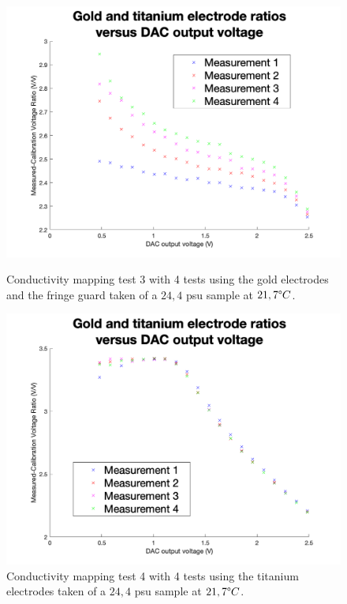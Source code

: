 \begin{figure}[ht]
    \begin{minipage}{0.5\textwidth}
        \centering
        \includegraphics[width=\textwidth]{Figures/Testing/Aus17}
        \caption{Conductivity mapping test 3 with 4 tests using the gold electrodes and the fringe guard taken of a $24,4$ \gls{psu} sample at $21,7\degree C$.}
        \label{fig:test11} %
    \end{minipage}
    \begin{minipage}{0.5\textwidth}
        \centering
        \includegraphics[width=\textwidth]{Figures/Testing/Ti17}
        \caption{Conductivity mapping test 4 with 4 tests using the titanium electrodes taken of a $24,4$ \gls{psu} sample at $21,7\degree C$.}
    \end{minipage}
\end{figure}

